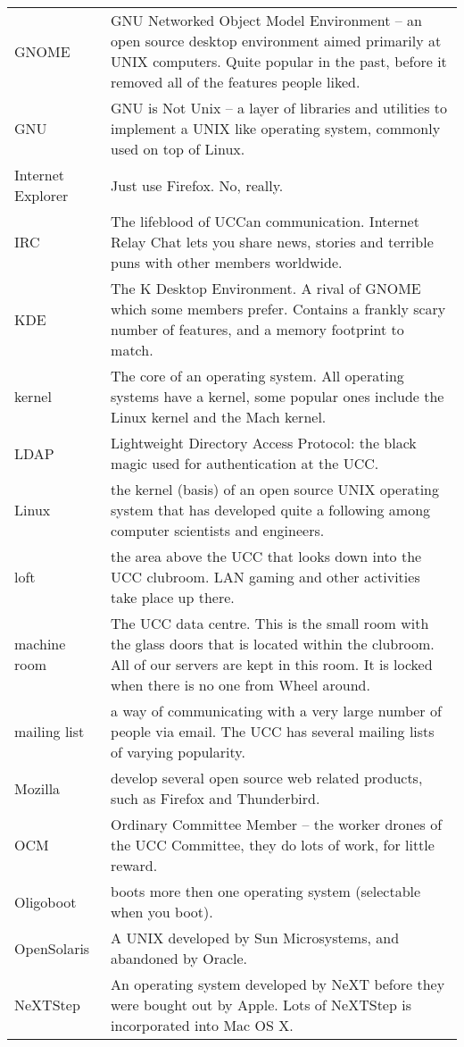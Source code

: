 \begin{tabular}{ll}
GNOME &
GNU Networked Object Model Environment – an open source desktop environment aimed primarily at UNIX computers. Quite popular in the past, before it removed all of the features people liked. \\
GNU &
GNU is Not Unix – a layer of libraries and utilities to implement a UNIX like operating system, commonly used on top of Linux. \\
Internet Explorer &
Just use Firefox. No, really. \\
IRC &
The lifeblood of UCCan communication. Internet Relay Chat lets you share news, stories and terrible puns with other members worldwide. \\
KDE &
The K Desktop Environment. A rival of GNOME which some members prefer. Contains a frankly scary number of features, and a memory footprint to match. \\
kernel &
The core of an operating system. All operating systems have a kernel, some popular ones include the Linux kernel and the Mach kernel. \\
LDAP &
Lightweight Directory Access Protocol: the black magic used for authentication at the UCC. \\
Linux &
the kernel (basis) of an open source UNIX operating system that has developed quite a following among computer scientists and engineers. \\
loft &
the area above the UCC that looks down into the UCC clubroom. LAN gaming and other activities take place up there. \\
machine room &
The UCC data centre. This is the small room with the glass doors that is located within the clubroom. All of our servers are kept in this room. It is locked when there is no one from Wheel around. \\
mailing list &
a way of communicating with a very large number of people via email. The UCC has several mailing lists of varying popularity. \\
Mozilla &
develop several open source web related products, such as Firefox and Thunderbird. \\
OCM &
Ordinary Committee Member – the worker drones of the UCC Committee, they do lots of work, for little reward. \\
Oligoboot &
boots more then one operating system (selectable when you boot). \\
OpenSolaris &
A UNIX developed by Sun Microsystems, and abandoned by Oracle. \\
NeXTStep &
An operating system developed by NeXT before they were bought out by Apple. Lots of NeXTStep is incorporated into Mac OS X. \\

\end{tabular}
